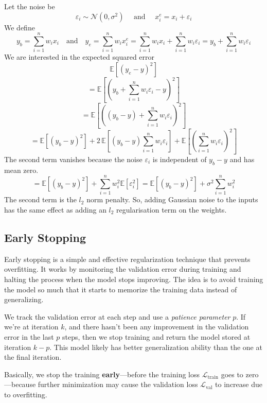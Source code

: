 Let the noise be
\[
\varepsilon_i \sim \mathcal{N}(0, \sigma^2) \quad \text{ and } \quad x_i^{e} = x_i + \varepsilon_i
\]
We define
\[
y_b = \sum_{i=1}^{n} w_i x_i
\quad \text{and} \quad
y_e = \sum_{i=1}^{n} w_i x_i^{e}
= \sum_{i=1}^{n} w_i x_i + \sum_{i=1}^{n} w_i \varepsilon_i = y_b + \sum_{i=1}^{n} w_i \varepsilon_i
\]
We are interested in the expected squared error
\[
\mathbb{E}\left[(y_e - y)^2\right]
\]
\[
= \mathbb{E}\left[(y_b + \sum_{i=1}^{n} w_i \varepsilon_i - y)^2\right]
\]
\[
= \mathbb{E}\left[\left((y_b - y) + \sum_{i=1}^{n} w_i \varepsilon_i\right)^2\right]
\]
\[
= \mathbb{E}\left[(y_b - y)^2\right]
+ 2 \, \mathbb{E}\left[(y_b - y) \sum_{i=1}^{n} w_i \varepsilon_i\right]
+ \mathbb{E}\left[\left(\sum_{i=1}^{n} w_i \varepsilon_i\right)^2\right]
\]
The second term vanishes because the noise \( \varepsilon_i \) is independent of \( y_b - y \) and has mean zero.
\[
= \mathbb{E}\left[(y_b - y)^2\right]
+ \sum_{i=1}^{n} w_i^2 \mathbb{E}[\varepsilon_i^2]
= \mathbb{E}\left[(y_b - y)^2\right] + \sigma^2 \sum_{i=1}^{n} w_i^2
\]
The second term is the $l_2$ norm penalty. So, adding Gaussian noise to the inputs has the same effect as adding an $l_2$ regularisation term on the weights.


\subsection{Early Stopping}

Early stopping is a simple and effective regularization technique that prevents overfitting. It works by monitoring the validation error during training and halting the process when the model stops improving. The idea is to avoid training the model so much that it starts to memorize the training data instead of generalizing.

We track the validation error at each step and use a \emph{patience parameter} \( p \). If we're at iteration \( k \), and there hasn't been any improvement in the validation error in the last \( p \) steps, then we stop training and return the model stored at iteration \( k - p \). This model likely has better generalization ability than the one at the final iteration.

Basically, we stop the training \textbf{early}—before the training loss \( \mathcal{L}_{\text{train}} \) goes to zero—because further minimization may cause the validation loss \( \mathcal{L}_{\text{val}} \) to increase due to overfitting.


